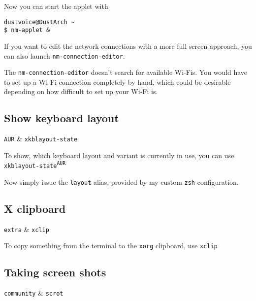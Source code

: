 \documentclass[10pt]{dustdoc}
\begin{document}
Now you can start the applet with

\begin{verbatim}
dustvoice@DustArch ~
$ nm-applet &
\end{verbatim}

If you want to edit the network connections with a more full screen approach, you can also launch \texttt{nm-connection-editor}.

\begin{NOTE}
    The \texttt{nm-connection-editor} doesn’t search for available Wi-Fis.
    You would have to set up a Wi-Fi connection completely by hand, which could be desirable depending on how difficult to set up your Wi-Fi is.
\end{NOTE}

\subsection{Show keyboard layout}
\label{sec:show-keyboard-layout}

\begin{packagetable}
    \texttt{AUR} & \texttt{xkblayout-state} \\
\end{packagetable}

To show, which keyboard layout and variant is currently in use, you can use \texttt{xkblayout-state\textsuperscript{\texttt{AUR}}}

Now simply issue the \texttt{layout} alias, provided by my custom \texttt{zsh} configuration.

\subsection{X clipboard}
\label{sec:x-clipboard}

\begin{packagetable}
    \texttt{extra} & \texttt{xclip} \\
\end{packagetable}

To copy something from the terminal to the \texttt{xorg} clipboard, use \texttt{xclip}

\subsection{Taking screen shots}
\label{sec:taking-screen-shots}

\begin{packagetable}
    \texttt{community} & \texttt{scrot} \\
\end{packagetable}
\end{document}

